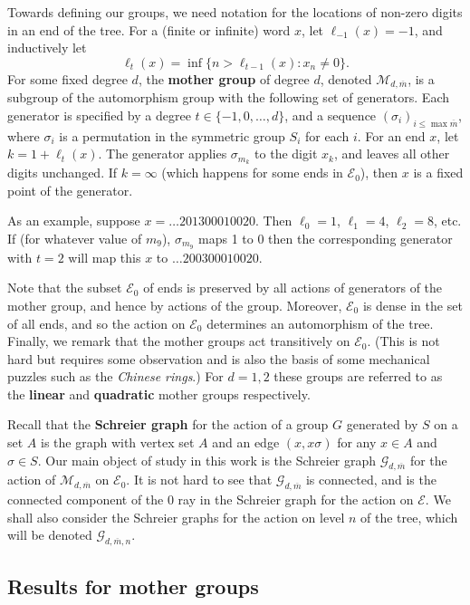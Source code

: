 \documentclass[12pt]{article}
\theoremstyle{definition}
\numberwithin{equation}{section}
\newcommand{\cG}{\mathcal{G}}
\newcommand{\cE}{\mathcal{E}}
\newcommand{\cM}{\mathcal{M}}
\newcommand{\mbar}{{\overline m}}
\begin{document}
Towards defining our groups, we need notation for the locations of non-zero digits in an end of the tree.
For a (finite or infinite) word $x$, let $\ell_{-1}(x) = -1$, and inductively let
\[
  \ell_t(x) = \inf \{n>\ell_{t-1}(x) : x_n \neq 0\}.
\]
For some fixed degree $d$, the \textbf{mother group} of degree $d$, denoted $\cM_{d,\mbar}$, is a subgroup of the automorphism group with the following set of generators.
Each generator is specified by a degree $t\in\{-1,0,\dots,d\}$, and a sequence $(\sigma_i)_{i\leq\max{\mbar}}$, where $\sigma_i$ is a permutation in the symmetric group $S_{i}$ for each $i$.
For an end $x$, let $k = 1+\ell_t(x)$.  The generator applies $\sigma_{m_k}$ to the digit $x_k$, and leaves all other digits unchanged.
If $k=\infty$ (which happens for some ends in $\cE_0$), then $x$ is a fixed point of the generator.

As an example, suppose $x=\dots201300010020$.
Then $\ell_{0}=1$,  $\ell_1=4$,  $\ell_2=8$, etc.
If (for whatever value of $m_9$), $\sigma_{m_9}$ maps 1 to 0 then the corresponding generator with $t=2$ will map this $x$ to $\dots200300010020$.

Note that the subset $\cE_0$ of ends is preserved by all actions of generators of the mother group, and hence by actions of the group.
Moreover, $\cE_0$ is dense in the set of all ends, and so the action on $\cE_0$ determines an automorphism of the tree.
Finally, we remark that the mother groups act transitively on $\cE_0$.
(This is not hard but requires some observation and is also the basis of some mechanical puzzles such as the \emph{Chinese rings}.)
For $d=1,2$ these groups are referred to as the \textbf{linear} and \textbf{quadratic} mother groups respectively.

Recall that the \textbf{Schreier graph} for the action of a group $G$ generated by $S$ on a set $A$ is the graph with vertex set $A$ and an edge $(x,x\sigma)$ for any $x\in A$ and $\sigma\in S$.
Our main object of study in this work is the Schreier graph $\cG_{d,\mbar}$ for the action of $\cM_{d,\mbar}$ on $\cE_0$.
It is not hard to see that $\cG_{d,\mbar}$ is connected, and is the connected component of the $0$ ray in the Schreier graph for the action on $\cE$.
We shall also consider the Schreier graphs for the action on level $n$ of the tree, which will be denoted $\cG_{d,\mbar,n}$.



\subsection{Results for mother groups}
\end{document}
